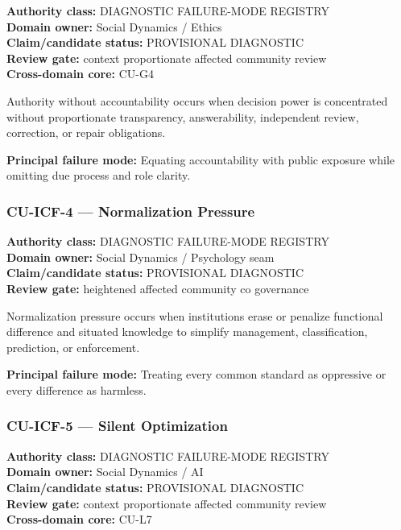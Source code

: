 \documentclass[
  11pt,
]{article}
\begin{document}
\textbf{Authority class:} DIAGNOSTIC FAILURE-MODE REGISTRY\\
\textbf{Domain owner:} Social Dynamics / Ethics\\
\textbf{Claim/candidate status:} PROVISIONAL DIAGNOSTIC\\
\textbf{Review gate:} context proportionate affected community review\\
\textbf{Cross-domain core:} CU-G4

Authority without accountability occurs when decision power is
concentrated without proportionate transparency, answerability,
independent review, correction, or repair obligations.

\textbf{Principal failure mode:} Equating accountability with public
exposure while omitting due process and role clarity.

\subsubsection{CU-ICF-4 --- Normalization
Pressure}\label{cu-icf-4-normalization-pressure}

\textbf{Authority class:} DIAGNOSTIC FAILURE-MODE REGISTRY\\
\textbf{Domain owner:} Social Dynamics / Psychology seam\\
\textbf{Claim/candidate status:} PROVISIONAL DIAGNOSTIC\\
\textbf{Review gate:} heightened affected community co governance

Normalization pressure occurs when institutions erase or penalize
functional difference and situated knowledge to simplify management,
classification, prediction, or enforcement.

\textbf{Principal failure mode:} Treating every common standard as
oppressive or every difference as harmless.

\subsubsection{CU-ICF-5 --- Silent
Optimization}\label{cu-icf-5-silent-optimization}

\textbf{Authority class:} DIAGNOSTIC FAILURE-MODE REGISTRY\\
\textbf{Domain owner:} Social Dynamics / AI\\
\textbf{Claim/candidate status:} PROVISIONAL DIAGNOSTIC\\
\textbf{Review gate:} context proportionate affected community review\\
\textbf{Cross-domain core:} CU-L7
\end{document}
